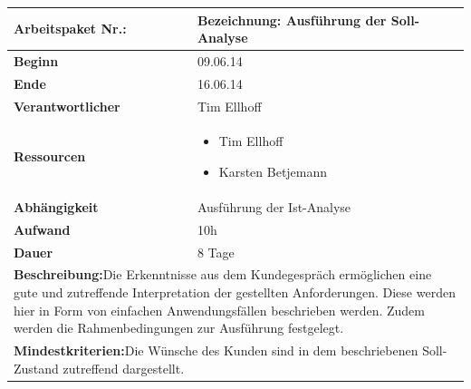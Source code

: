 \documentclass[fontsize=12pt,paper=a4,twoside]{scrartcl}
\begin{document}
	\begin{verbatim} 
	\end{verbatim}
	
	\begin{tabular}{|p{5.3cm}|p{9.7cm}|}\hline
		\textbf{Arbeitspaket Nr.:}  & \textbf{Bezeichnung:} Ausführung der Soll-Analyse\\ \hline \hline
		\textbf{Beginn} & 09.06.14\\ \hline
		\textbf{Ende} & 16.06.14\\ \hline
		\textbf{Verantwortlicher} & Tim Ellhoff\\ \hline
		\textbf{Ressourcen} & \begin{itemize}
			\item Tim Ellhoff
			\item Karsten Betjemann
		\end{itemize}    \\ \hline
		\textbf{Abhängigkeit} & Ausführung der Ist-Analyse\\ \hline
		\textbf{Aufwand} & 10h\\ \hline
		\textbf{Dauer} & 8 Tage\\ \hline
		\multicolumn{2}{|p{15cm}|}{\textbf{Beschreibung:}\newline Die Erkenntnisse aus dem Kundegespräch ermöglichen eine gute und zutreffende Interpretation der gestellten Anforderungen. Diese werden hier in Form von einfachen Anwendungsfällen beschrieben werden. Zudem werden die Rahmenbedingungen zur Ausführung festgelegt. }\\ \hline
		\multicolumn{2}{|p{15cm}|}{\textbf{Mindestkriterien:}\newline Die Wünsche des Kunden sind in dem beschriebenen Soll-Zustand zutreffend dargestellt. }\\ \hline
	\end{tabular}
	
	\begin{verbatim} 
	\end{verbatim}
	
\end{document}
